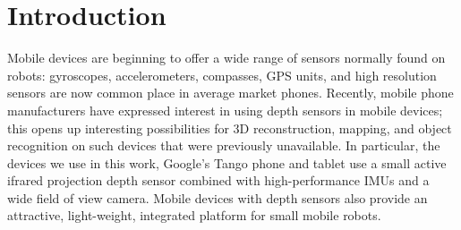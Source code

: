 \documentclass[conference,10pt]{IEEEtran}
\begin{document}
\section{Introduction}

Mobile devices are beginning to offer a wide range of sensors normally found on
robots: gyroscopes, accelerometers, compasses, GPS units, and high resolution
sensors are now common place in average market phones. Recently, mobile phone
manufacturers have expressed interest in using depth sensors in mobile devices;
this opens up interesting possibilities for 3D reconstruction, mapping,
and object recognition on such devices that were previously unavailable. In
particular, the devices we use in this work, Google's Tango \cite{Tango} phone
and tablet use a small active ifrared projection depth sensor combined with
high-performance IMUs and a wide field of view camera. Mobile devices with depth
sensors also provide an attractive, light-weight, integrated platform for small mobile robots.
\end{document}
